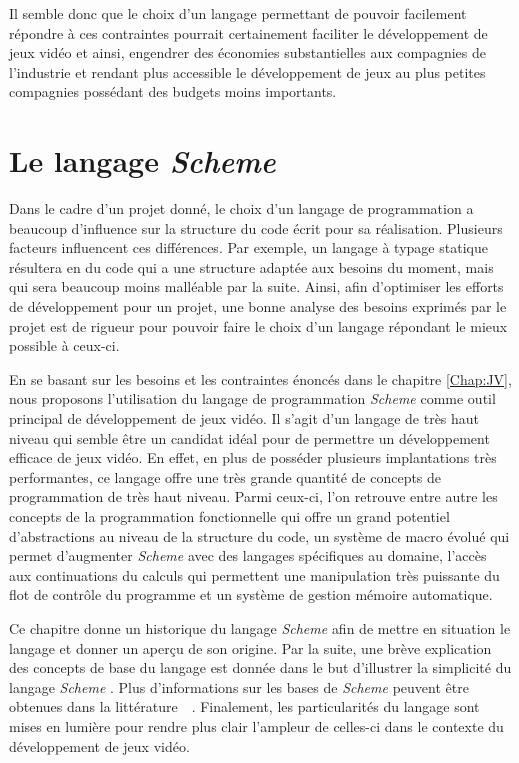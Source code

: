 \documentclass[12pt,twoside,letterpaper,francais]{book}
\newcommand{\Schemelang}{{\textit{Scheme }}}
\begin{document}
Il semble donc que le choix d'un langage permettant de pouvoir
facilement répondre à ces contraintes pourrait certainement faciliter
le développement de jeux vidéo et ainsi, engendrer des économies
substantielles aux compagnies de l'industrie et rendant plus
accessible le développement de jeux au plus petites compagnies
possédant des budgets moins importants.


\clearpage

\chapter{Le langage \Schemelang} \label{Chap:Scheme}
Dans le cadre d'un projet donné, le choix d'un langage de
programmation a beaucoup d'influence sur la structure du code écrit
pour sa réalisation. Plusieurs facteurs influencent ces
différences. Par exemple, un langage à typage statique résultera en du
code qui a une structure adaptée aux besoins du moment, mais qui sera
beaucoup moins malléable par la suite. Ainsi, afin d'optimiser les
efforts de développement pour un projet, une bonne analyse des besoins
exprimés par le projet est de rigueur pour pouvoir faire le choix d'un
langage répondant le mieux possible à ceux-ci.

En se basant sur les besoins et les contraintes énoncés dans le
chapitre \ref{Chap:JV}, nous proposons l'utilisation du langage de
programmation \Schemelang comme outil principal de développement de jeux
vidéo. Il s'agit d'un langage de très haut niveau qui semble être un
candidat idéal pour de permettre un développement efficace de jeux
vidéo. En effet, en plus de posséder plusieurs implantations très
performantes, ce langage offre une très grande quantité de concepts de
programmation de très haut niveau. Parmi ceux-ci, l'on retrouve entre
autre les concepts de la programmation fonctionnelle qui offre un
grand potentiel d'abstractions au niveau de la structure du code, un
système de macro évolué qui permet d'augmenter \Schemelang avec des
langages spécifiques au domaine, l'accès aux continuations du calculs
qui permettent une manipulation très puissante du flot de contrôle du
programme et un système de gestion mémoire automatique.

Ce chapitre donne un historique du langage \Schemelang afin de mettre en
situation le langage et donner un aperçu de son origine. Par la suite,
une brève explication des concepts de base du langage est donnée dans
le but d'illustrer la simplicité du langage \Schemelang. Plus
d'informations sur les bases de \Schemelang peuvent être obtenues dans la
littérature~\cite{R5RS}~\cite{SICP}. Finalement, les particularités du
langage sont mises en lumière pour rendre plus clair l'ampleur de
celles-ci dans le contexte du développement de jeux vidéo.
\end{document}
